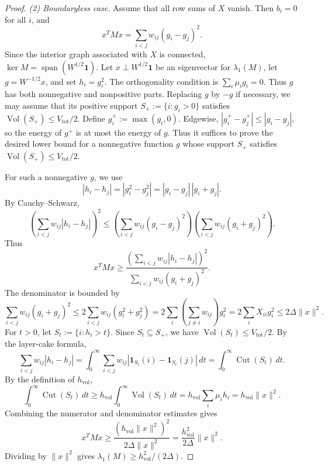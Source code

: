 \documentclass{article}
\newcommand{\one}{\mathbf{1}}
\begin{document}
\begin{proof}
\emph{(2) Boundaryless case.}
Assume that all row sums of \(X\) vanish. Then \(b_i=0\) for all \(i\), and
\[
x^TMx=\sum_{i<j}w_{ij}(g_i-g_j)^2.
\]
Since the interior graph associated with \(X\) is connected, \(\ker M=\operatorname{span}(W^{1/2}\one)\). Let \(x\perp W^{1/2}\one\) be an eigenvector for \(\lambda_1(M)\), let \(g=W^{-1/2}x\), and set \(h_i=g_i^2\). The orthogonality condition is \(\sum_i\mu_i g_i=0\). Thus \(g\) has both nonnegative and nonpositive parts. Replacing \(g\) by \(-g\) if necessary, we may assume that its positive support \(S_+:=\{i:g_i>0\}\) satisfies \(\operatorname{Vol}(S_+)\leq V_{\mathrm{tot}}/2\). Define \(g_i^+:=\max(g_i,0)\). Edgewise, \(|g_i^+-g_j^+|\leq |g_i-g_j|\), so the energy of \(g^+\) is at most the energy of \(g\). Thus it suffices to prove the desired lower bound for a nonnegative function \(g\) whose support \(S_+\) satisfies \(\operatorname{Vol}(S_+)\leq V_{\mathrm{tot}}/2\).

For such a nonnegative \(g\), we use
\[
|h_i-h_j|=|g_i^2-g_j^2|=|g_i-g_j|\,|g_i+g_j|.
\]
By Cauchy--Schwarz,
\[
\left(\sum_{i<j}w_{ij}|h_i-h_j|\right)^2
\leq
\left(\sum_{i<j}w_{ij}(g_i-g_j)^2\right)
\left(\sum_{i<j}w_{ij}(g_i+g_j)^2\right).
\]
Thus
\[
x^TMx\geq
\frac{\left(\sum_{i<j}w_{ij}|h_i-h_j|\right)^2}
{\sum_{i<j}w_{ij}(g_i+g_j)^2}.
\]
The denominator is bounded by
\[
\sum_{i<j}w_{ij}(g_i+g_j)^2
\leq 2\sum_{i<j}w_{ij}(g_i^2+g_j^2)
=
2\sum_i\left(\sum_{j\neq i}w_{ij}\right)g_i^2
=
2\sum_iX_{ii}g_i^2
\leq 2\Delta\|x\|^2.
\]
For \(t>0\), let \(S_t:=\{i:h_i>t\}\). Since \(S_t\subseteq S_+\), we have \(\operatorname{Vol}(S_t)\leq V_{\mathrm{tot}}/2\). By the layer-cake formula,
\[
\sum_{i<j}w_{ij}|h_i-h_j|
=
\int_0^\infty\sum_{i<j}w_{ij}|\mathbf 1_{S_t}(i)-\mathbf 1_{S_t}(j)|\,dt
=
\int_0^\infty\operatorname{Cut}(S_t)\,dt.
\]
By the definition of \(h_{\mathrm{vol}}\),
\[
\int_0^\infty\operatorname{Cut}(S_t)\,dt
\geq
h_{\mathrm{vol}}\int_0^\infty\operatorname{Vol}(S_t)\,dt
=
h_{\mathrm{vol}}\sum_i\mu_i h_i
=
h_{\mathrm{vol}}\|x\|^2.
\]
Combining the numerator and denominator estimates gives
\[
x^TMx\geq
\frac{(h_{\mathrm{vol}}\|x\|^2)^2}{2\Delta\|x\|^2}
=
\frac{h_{\mathrm{vol}}^2}{2\Delta}\|x\|^2.
\]
Dividing by \(\|x\|^2\) gives \(\lambda_1(M)\geq h_{\mathrm{vol}}^2/(2\Delta)\).
\end{proof}
\end{document}
